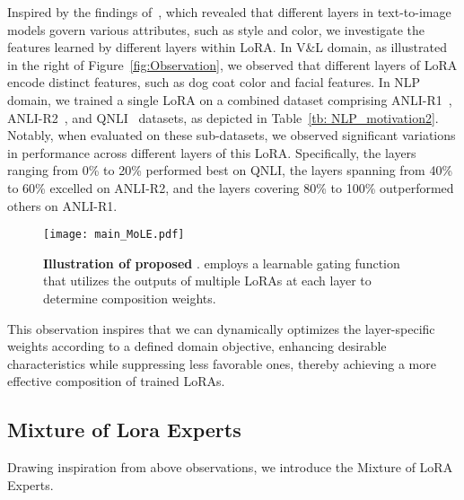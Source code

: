 Inspired by the findings of~\citep{voynov2023p+}, which revealed that different layers in text-to-image models govern various attributes, such as style and color, we investigate the features learned by different layers within LoRA.
In V\&L domain, as illustrated in the right of Figure~\ref{fig:Observation}, we observed that different layers of LoRA encode distinct features, such as dog coat color and facial features.
In NLP domain, we trained a single LoRA on a combined dataset comprising ANLI-R1~\citep{ANLI}, ANLI-R2~\citep{ANLI}, and QNLI~\citep{QNLI} datasets, as depicted in Table~\ref{tb: NLP_motivation2}. Notably, when evaluated on these sub-datasets, we observed significant variations in performance across different layers of this LoRA. Specifically, the layers ranging from 0\% to 20\% performed best on QNLI, the layers spanning from 40\% to 60\% excelled on ANLI-R2, and the layers covering 80\% to 100\% outperformed others on ANLI-R1.
\begin{wrapfigure}{R}{0.45\textwidth}
\vspace{-10mm}
\centering
\texttt{[image: main\_MoLE.pdf]}
\vspace{-6mm}
\caption{\textbf{Illustration of proposed \our{}}. \our{} employs a learnable gating function that utilizes the outputs of multiple LoRAs at each layer to determine composition weights.}
\label{fig:Mole_structure}
\vspace{-13mm}
\end{wrapfigure}
This observation inspires that we can dynamically optimizes the layer-specific weights according to a defined domain objective, enhancing desirable characteristics while suppressing less favorable ones, thereby achieving a more effective composition of trained LoRAs.

\subsection{Mixture of Lora Experts}
\label{Sec:MOLE}
Drawing inspiration from above observations, we introduce the Mixture of LoRA Experts.


